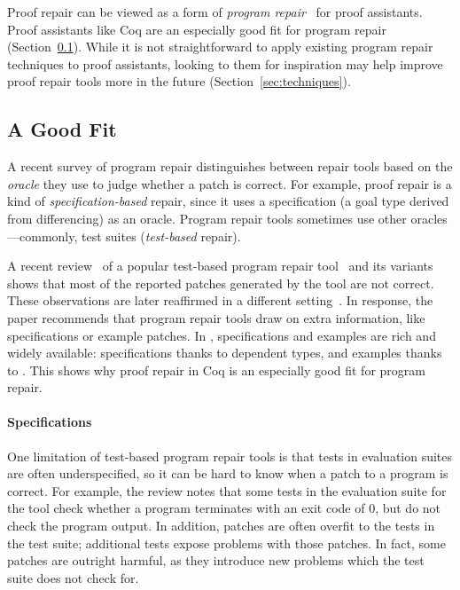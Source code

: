 Proof repair can be viewed as a form of \textit{program repair}~\cite{Monperrus:2018:ASR:3177787.3105906, Gazzola:2018:ASR:3180155.3182526}
for proof assistants. %
Proof assistants like Coq are an especially good fit for program repair (Section~\ref{sec:lessons}).
While it is not straightforward to apply existing program repair techniques to proof assistants,
looking to them for inspiration may help improve proof repair tools more in the future (Section~\ref{sec:techniques}).

\subsection{A Good Fit}
\label{sec:lessons}

A recent survey of program repair distinguishes between repair tools based on the \textit{oracle} they use to
judge whether a patch is correct.
For example, proof repair is a kind of \textit{specification-based} repair,
since it uses a specification (a goal type derived from differencing) as an oracle.
Program repair tools sometimes use other oracles---commonly, test suites (\textit{test-based} repair).

A recent review~\cite{Qi:2015:APP:2771783.2771791} of a popular test-based program repair tool~\cite{LeGoues:2012:SSA:2337223.2337225} and its variants
shows that most of the reported patches generated by the tool are not correct.
These observations are later reaffirmed in a different setting~\cite{DBLP:journals/corr/abs-1811-02429}.
In response, the paper recommends that program repair tools draw on extra information, like specifications or example patches.
In , specifications and examples are rich and widely available: specifications thanks to dependent types,
and examples thanks to . This shows why proof repair in Coq is an especially good fit for program repair.
 
\paragraph{Specifications}
One limitation of test-based program repair tools is that tests in evaluation suites are often underspecified,
so it can be hard to know when a patch to a program is correct.
For example, the review notes that some tests in the evaluation suite for the tool check whether a program terminates with an exit code of 0, 
but do not check the program output.
In addition, patches are often overfit to the tests in the test suite; additional tests expose problems with those patches.
In fact, some patches are outright harmful, as they introduce new problems which the test suite does not check for.

